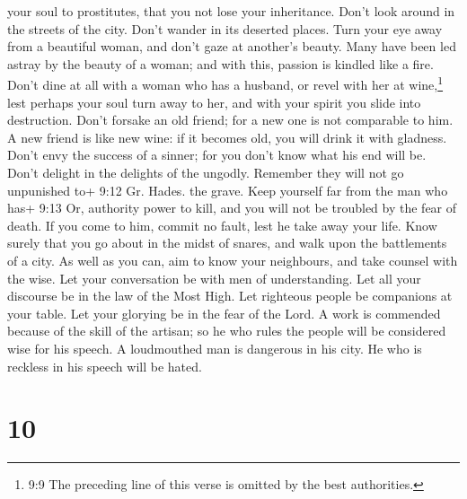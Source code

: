 your soul to prostitutes, that you not lose your inheritance.
 Don't look around in the streets of the city. Don't wander
in its deserted places.  Turn your eye away from a beautiful
woman, and don't gaze at another's beauty. Many have been led astray by
the beauty of a woman; and with this, passion is kindled like a fire.
 Don't dine at all with a woman who has a husband, or revel
with her at wine,\footnote{9:9 The preceding line of this verse is
  omitted by the best authorities.} lest perhaps your soul turn away to
her, and with your spirit you slide into destruction. 
Don't forsake an old friend; for a new one is not comparable to him. A
new friend is like new wine: if it becomes old, you will drink it with
gladness.  Don't envy the success of a sinner; for you
don't know what his end will be.  Don't delight in the
delights of the ungodly. Remember they will not go unpunished to+ 9:12
Gr. Hades. the grave.  Keep yourself far from the man who
has+ 9:13 Or, authority power to kill, and you will not be troubled by
the fear of death. If you come to him, commit no fault, lest he take
away your life. Know surely that you go about in the midst of snares,
and walk upon the battlements of a city.  As well as you
can, aim to know your neighbours, and take counsel with the wise.
 Let your conversation be with men of understanding. Let
all your discourse be in the law of the Most High.  Let
righteous people be companions at your table. Let your glorying be in
the fear of the Lord.  A work is commended because of the
skill of the artisan; so he who rules the people will be considered wise
for his speech.  A loudmouthed man is dangerous in his
city. He who is reckless in his speech will be hated.

\hypertarget{section-7}{%
\section{10}\label{section-7}}

